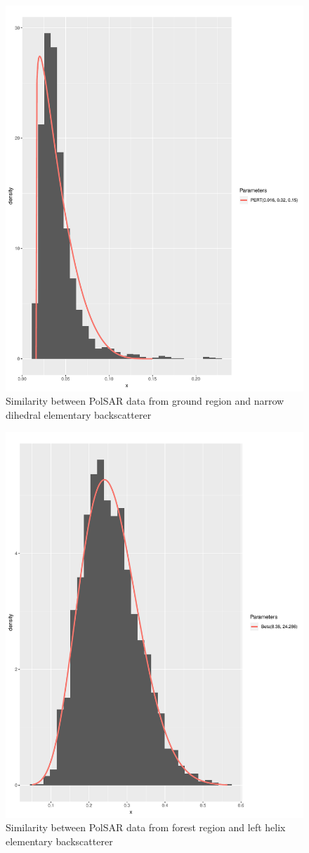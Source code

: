 \documentclass[conference]{IEEEtran}
\begin{document}
\begin{figure}[!ht]
    \centering
    \includegraphics[width = .9\linewidth, height = .7\linewidth]{../../../Figures/paper_19_05/nd_ground.pdf}
    \caption{Similarity between PolSAR data from ground region and narrow dihedral elementary backscatterer}
    \label{fig:gr_nd}
\end{figure}

\begin{figure}[!ht]
    \centering
    \includegraphics[width = .9\linewidth, height = .7\linewidth]{../../../Figures/paper_19_05/lh_vegetation.pdf}
    \caption{Similarity between PolSAR data from forest region and left helix elementary backscatterer}
    \label{fig:fr_lh}
\end{figure}
\end{document}
